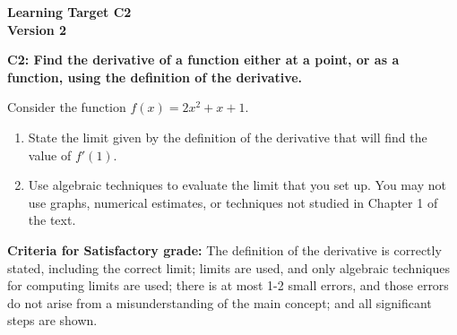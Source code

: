 \documentclass[10pt]{article}
\begin{document}
	\vspace*{0in}

		\begin{center}
			\textbf{Learning Target C2 \\
			Version 2} \\
		\end{center}


\begin{framed}
	\textbf{C2: Find the derivative of a function either at a point, or as a function, using the definition of the derivative.
}
\end{framed}

Consider the function $f(x) = 2x^2 + x + 1$. 

\begin{enumerate}
    \item State the limit given by the definition of the derivative that will find the value of $f'(1).$
    
    \vspace{1in} 
    
    
    \item Use algebraic techniques to evaluate the limit that you set up. You may not use graphs, numerical estimates, or techniques not studied in Chapter 1 of the text. 
\end{enumerate}



\vfill


\begin{small}
    \begin{framed}
        	\textbf{Criteria for Satisfactory grade:} The definition of the derivative is correctly stated, including the correct limit; limits are used, and only algebraic techniques for computing limits are used; there is at most 1-2 small errors, and those errors do not arise from a misunderstanding of the main concept; and all significant steps are shown. 
    \end{framed}

\end{small}
\end{document}
